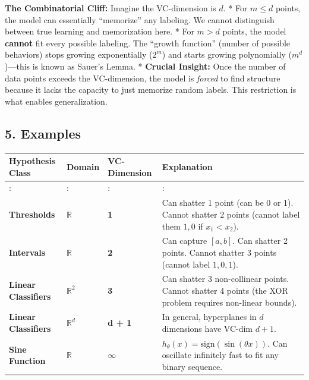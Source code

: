 \documentclass[
  italian,
  11pt,
]{article}
\newcounter{none} %
\begin{document}
\textbf{The Combinatorial Cliff:} Imagine the VC-dimension is \(d\). *
For \(m \le d\) points, the model can essentially ``memorize'' any
labeling. We cannot distinguish between true learning and memorization
here. * For \(m > d\) points, the model \textbf{cannot} fit every
possible labeling. The ``growth function'' (number of possible
behaviors) stops growing exponentially (\(2^m\)) and starts growing
polynomially (\(m^d\))---this is known as Sauer's Lemma. *
\textbf{Crucial Insight:} Once the number of data points exceeds the
VC-dimension, the model is \emph{forced} to find structure because it
lacks the capacity to just memorize random labels. This restriction is
what enables generalization.

\subsection{5. Examples}\label{examples}

{\def\LTcaptype{none} %
\begin{longtable}[]{@{}
  >{\raggedright\arraybackslash}p{}
  >{\raggedright\arraybackslash}p{}
  >{\raggedright\arraybackslash}p{}
  >{\raggedright\arraybackslash}p{}@{}}
\toprule\noalign{}
\begin{minipage}[b]{\linewidth}\raggedright
Hypothesis Class
\end{minipage} & \begin{minipage}[b]{\linewidth}\raggedright
Domain
\end{minipage} & \begin{minipage}[b]{\linewidth}\raggedright
VC-Dimension
\end{minipage} & \begin{minipage}[b]{\linewidth}\raggedright
Explanation
\end{minipage} \\
\midrule\noalign{}
\endhead
\bottomrule\noalign{}
\endlastfoot
: & : & : & : \\
\textbf{Thresholds} & \(\mathbb{R}\) & \textbf{1} & Can shatter 1 point
(can be 0 or 1). Cannot shatter 2 points (cannot label them \(1, 0\) if
\(x_1 < x_2\)). \\
\textbf{Intervals} & \(\mathbb{R}\) & \textbf{2} & Can capture
\([a,b]\). Can shatter 2 points. Cannot shatter 3 points (cannot label
\(1, 0, 1\)). \\
\textbf{Linear Classifiers} & \(\mathbb{R}^2\) & \textbf{3} & Can
shatter 3 non-collinear points. Cannot shatter 4 points (the XOR problem
requires non-linear bounds). \\
\textbf{Linear Classifiers} & \(\mathbb{R}^d\) & \textbf{d + 1} & In
general, hyperplanes in \(d\) dimensions have VC-dim \(d+1\). \\
\textbf{Sine Function} & \(\mathbb{R}\) & \textbf{\(\infty\)} &
\(h_\theta(x) = \text{sign}(\sin(\theta x))\). Can oscillate infinitely
fast to fit any binary sequence. \\
\end{longtable}
}
\end{document}
